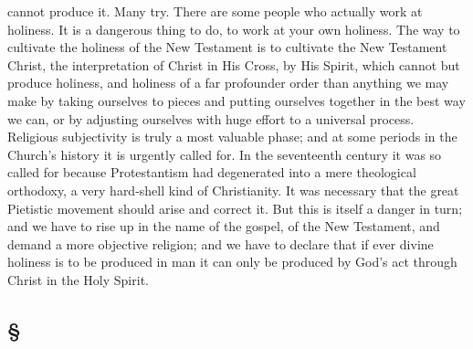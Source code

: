 \documentclass[draft]{ptfdoc}
\begin{document}
cannot produce it. Many try. There are some 
people who actually work at holiness. It is a 
dangerous thing to do, to work at your own 
holiness. The way to cultivate the holiness of 
the New Testament is to cultivate the New Testament 
Christ, the interpretation of Christ in 
His Cross, by His Spirit, which cannot but 
produce holiness, and holiness of a far profounder 
order than anything we may make 
by taking ourselves to pieces and putting 
ourselves together in the best way we can, 
or by adjusting ourselves with huge effort 
to a universal process. Religious subjectivity 
is truly a most valuable phase; and at some 
periods in the Church's history it is urgently 
called for. In the seventeenth century it was 
so called for because Protestantism had degenerated 
into a mere theological orthodoxy, 
a very hard-shell kind of Christianity. It was 
necessary that the great Pietistic movement 
should arise and correct it. But this is itself a 
danger in turn; and we have to rise up in the 
name of the gospel, of the New Testament, and 
demand a more objective religion; and we have 
to declare that if ever divine holiness is to be 
produced in man it can only be produced by 
God's act through Christ in the Holy Spirit.   

\subsection*{
\S
}
\end{document}
